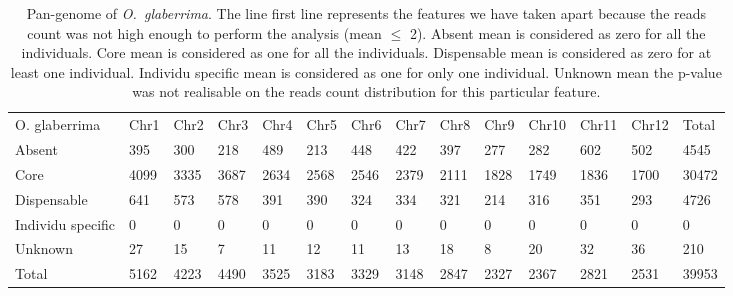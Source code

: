 \documentclass[10pt,letterpaper]{article}
\begin{document}
\begin{table}[]
\centering
\footnotesize
\begin{tabular}{llllllllllllll}
O. glaberrima                 & Chr1 & Chr2 & Chr3 & Chr4 & Chr5 & Chr6 & Chr7 & Chr8 & Chr9 & Chr10 & Chr11 & Chr12 & Total \\
Absent                        & 395  & 300  & 218  & 489  & 213  & 448  & 422  & 397  & 277  & 282   & 602   & 502   & 4545  \\
Core                          & 4099 & 3335 & 3687 & 2634 & 2568 & 2546 & 2379 & 2111 & 1828 & 1749  & 1836  & 1700  & 30472 \\
Dispensable                   & 641  & 573  & 578  & 391  & 390  & 324  & 334  & 321  & 214  & 316   & 351   & 293   & 4726  \\
Individu specific             & 0    & 0    & 0    & 0    & 0    & 0    & 0    & 0    & 0    & 0     & 0     & 0     & 0     \\
Unknown                       & 27   & 15   & 7    & 11   & 12   & 11   & 13   & 18   & 8    & 20    & 32    & 36    & 210   \\
Total                         & 5162 & 4223 & 4490 & 3525 & 3183 & 3329 & 3148 & 2847 & 2327 & 2367  & 2821  & 2531  & 39953
\end{tabular}
\caption{Pan-genome of \emph{O.~glaberrima}. The line first line represents the features we have taken apart because the reads count was not high enough to perform the analysis (mean $\leq$ 2). Absent mean is considered as zero for all the individuals. 
Core mean is considered as one for all the individuals. Dispensable mean is considered as zero for at least one individual. Individu specific mean is considered as one for only one individual. Unknown mean the p-value was not realisable on 
the reads count distribution for this particular feature.}
\label{panG-glab}
\end{table}
\end{document}

